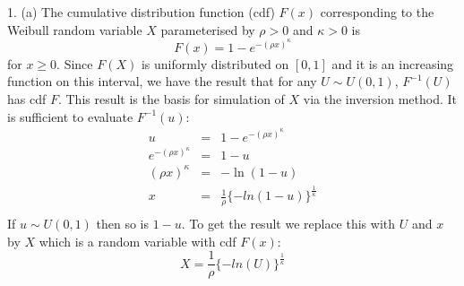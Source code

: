 

1. (a) The cumulative distribution function (cdf) $F(x)$ corresponding to the
Weibull random variable $X$ parameterised by $\rho > 0$ and $\kappa > 0$ is
\begin{equation*}
  F(x) = 1 - e^{-(\rho x)^\kappa}
\end{equation*}
for $x \ge 0$. Since $F(X)$ is uniformly distributed on $[0,1]$ and it
is an increasing function on this interval, we have the result that
for any $U \sim U(0,1)$, $F^{-1}(U)$ has cdf $F$. This result is the
basis for simulation of $X$ via the  inversion method. It is
sufficient to evaluate $F^{-1}(u)$:
\begin{eqnarray*}
  u & = & 1 - e^{-(\rho x)^\kappa} \\
  e^{-(\rho x)^\kappa} & = & 1-u\\
  (\rho x)^\kappa & = & -\ln(1-u) \\
  x & = & \frac{1}{\rho} \{ -ln(1-u) \} ^{\frac{1}{\kappa}}\\
  \end{eqnarray*}
If $u\sim U(0,1)$ then so is $1-u$. To get the result we replace this with $U$ and $x$ by
$X$ which is a random variable with cdf $F(x)$:
\begin{equation*}
  X = \frac{1}{\rho} \{ -ln(U) \} ^{\frac{1}{\kappa}}
  \end{equation*}

